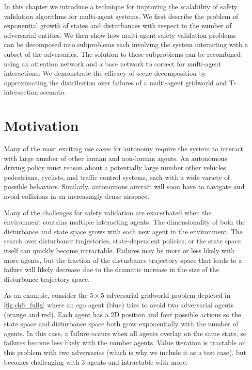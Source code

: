 In this chapter we introduce a technique for improving the scalability of safety validation algorithms for multi-agent systems. We first describe the problem of exponential growth of states and disturbances with respect to the number of adversarial entities. We then show how multi-agent safety validation problems can be decomposed into subproblems each involving the system interacting with a subset of the adversaries. The solution to these subproblems can be recombined using an attention network and a base network to correct for multi-agent interactions. We demonstrate the efficacy of scene decomposition by approximating the distribution over failures of a multi-agent gridworld and T-intersection scenario. 

\section{Motivation}

Many of the most exciting use cases for autonomy require the system to interact with large number of other human and non-human agents. An autonomous driving policy must reason about a potentially large number other vehicles, pedestrians, cyclists, and traffic control systems, each with a wide variety of possible behaviors. Similarly, autonomous aircraft will soon have to navigate and avoid collisions in an increasingly dense airspace.

Many of the challenges for safety validation are exacerbated when the environment contains multiple interacting agents. The dimensionality of both the disturbance and state space grows with each new agent in the environment. The search over disturbance trajectories, state-dependent policies, or the state space itself can quickly become intractable. Failures may be more or less likely with more agents, but the fraction of the disturbance trajectory space that leads to a failure will likely decrease due to the dramatic increase in the size of the disturbance trajectory space. 

As an example, consider the $5 \times 5$ adversarial gridworld problem depicted in \cref{fig:ch6_fullg} where an ego agent (blue) tries to avoid two adversarial agents (orange and red).  Each agent has a 2D position and four possible actions so the state space and disturbance space both grow exponentially with the number of agents. In this case, a failure occurs when all agents overlap on the same state, so failures become less likely with the number agents. Value iteration is tractable on this problem with two adversaries (which is why we include it as a test case), but becomes challenging with \num{3} agents and intractable with more.

